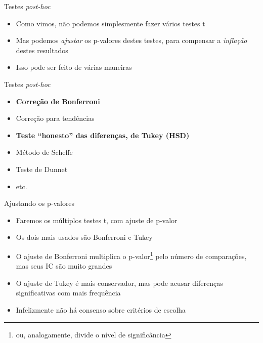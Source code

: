 \documentclass{beamer}
\begin{document}
\begin{frame}{Testes {\em post-hoc}}
  \begin{itemize}
    \footnotesize
  \item Como vimos, não podemos simplesmente fazer vários testes t
    \bigskip
    \bigskip
  \item Mas podemos {\em ajustar} os p-valores destes testes, para compensar a {\em inflação} destes resultados
    \bigskip
    \bigskip
  \item Isso pode ser feito de várias maneiras
  \end{itemize}
\end{frame}

\begin{frame}{Testes {\em post-hoc}}
  \begin{itemize}
    \small
  \item {\bf Correção de Bonferroni}
  \item Correção para tendências
  \item {\bf Teste ``honesto'' das diferenças, de Tukey (HSD)}
  \item Método de Scheffe
  \item Teste de Dunnet
  \item etc.
  \end{itemize}
\end{frame}

\begin{frame}{Ajustando os p-valores}
  \begin{itemize}
    \footnotesize
  \item Faremos os múltiplos testes t, com ajuste de p-valor
  \item Os dois mais usados são Bonferroni e Tukey
    \bigskip
    \bigskip
 \item O ajuste de Bonferroni multiplica o p-valor\footnote{ou, analogamente, divide o nível de significância} pelo número de comparações, mas seus IC são muito grandes
    \bigskip
 \item O ajuste de Tukey é mais conservador, mas pode acusar diferenças significativas com mais frequência
    \bigskip
    \bigskip
 \item Infelizmente não há consenso sobre critérios de escolha
  \end{itemize}
\end{frame}
\end{document}
